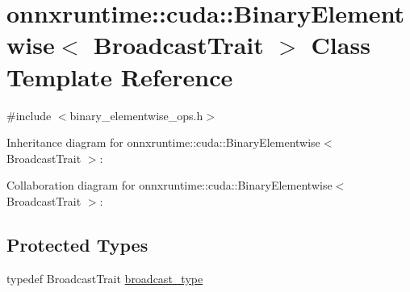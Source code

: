 \hypertarget{classonnxruntime_1_1cuda_1_1BinaryElementwise}{}\section{onnxruntime\+:\+:cuda\+:\+:Binary\+Elementwise$<$ Broadcast\+Trait $>$ Class Template Reference}
\label{classonnxruntime_1_1cuda_1_1BinaryElementwise}


{\ttfamily \#include $<$binary\+\_\+elementwise\+\_\+ops.\+h$>$}



Inheritance diagram for onnxruntime\+:\+:cuda\+:\+:Binary\+Elementwise$<$ Broadcast\+Trait $>$\+:


Collaboration diagram for onnxruntime\+:\+:cuda\+:\+:Binary\+Elementwise$<$ Broadcast\+Trait $>$\+:
\subsection*{Protected Types}
\begin{DoxyCompactItemize}
\item 
typedef Broadcast\+Trait \mbox{\hyperlink{classonnxruntime_1_1cuda_1_1BinaryElementwise_a6b23a26618db540bab3ea9073b798a56}{broadcast\+\_\+type}}
\end{DoxyCompactItemize}
